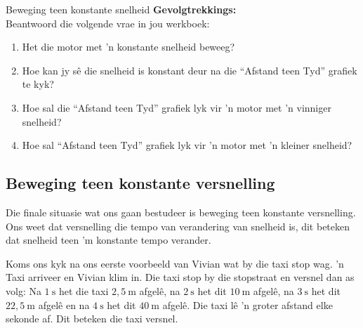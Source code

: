 \begin{g_experiment}{Beweging teen konstante snelheid}
\textbf{Gevolgtrekkings:}\\
Beantwoord die volgende vrae in jou werkboek:
\begin{enumerate}[noitemsep, label=\textbf{\arabic*}. ] 
    \item Het die motor met 'n konstante snelheid beweeg?
    \item Hoe kan jy s\^e die snelheid is konstant deur na die ``Afstand teen Tyd'' grafiek te kyk?
    \item Hoe sal die ``Afstand teen Tyd'' grafiek lyk vir 'n motor met 'n vinniger snelheid?
    \item Hoe sal ``Afstand teen Tyd'' grafiek lyk vir 'n motor met 'n kleiner snelheid?
\end{enumerate}
\end{g_experiment}
        \par 


\subsection*{Beweging teen konstante versnelling}
            \nopagebreak
Die finale situasie wat ons gaan bestudeer is beweging teen konstante versnelling. Ons weet dat versnelling die tempo van verandering van snelheid is, dit beteken dat snelheid teen 'm konstante tempo verander.\par 
        
Koms ons kyk na ons eerste voorbeeld van Vivian wat by die taxi stop wag. 'n Taxi arriveer en Vivian klim in. Die taxi stop by die stopstraat en versnel dan as volg: Na $1~\text{s}$ het die taxi $2,5~\text{m}$ afgel\^e, na $2~\text{s}$ het dit $10~\text{m}$ afgel\^e, na $3~\text{s}$ het dit $22,5~\text{m}$ afgel\^e en na $4~\text{s}$ het dit $40~\text{m}$ afgel\^e. Die taxi l\^e 'n groter afstand elke sekonde af. Dit beteken die taxi versnel.\par 

